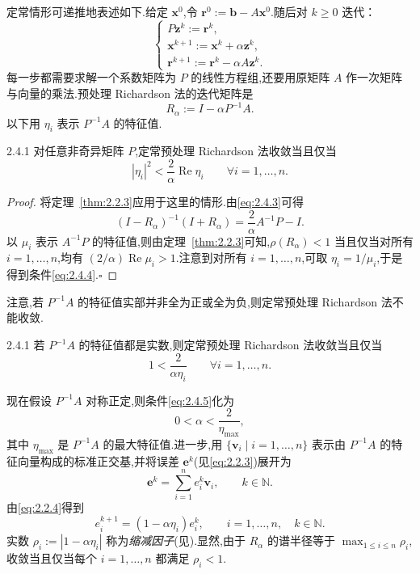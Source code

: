定常情形可递推地表述如下.给定 \(\boldsymbol{x}^0\),令 \(\boldsymbol{r}^0:=\boldsymbol{b}-A\boldsymbol{x}^0\).随后对 \(k\ge0\) 迭代：
\begin{equation}\label{eq:2.4.2}
  \begin{cases}
    P\boldsymbol{z}^k:=\boldsymbol{r}^k,\\
    \boldsymbol{x}^{k+1}:=\boldsymbol{x}^k+\alpha\boldsymbol{z}^k,\\
    \boldsymbol{r}^{k+1}:=\boldsymbol{r}^k-\alpha A\boldsymbol{z}^k.
  \end{cases}
\end{equation}
每一步都需要求解一个系数矩阵为 \(P\) 的线性方程组,还要用原矩阵 \(A\) 作一次矩阵与向量的乘法.预处理 Richardson 法的迭代矩阵是
\begin{equation}\label{eq:2.4.3}
  R_\alpha:=I-\alpha P^{-1}A.
\end{equation}
以下用 \(\eta_i\) 表示 \(P^{-1}A\) 的特征值.

\begin{theorem}[]{2.4.1}
对任意非奇异矩阵 \(P\),定常预处理 Richardson 法收敛当且仅当
\begin{equation}\label{eq:2.4.4}
  |\eta_i|^2<\frac2\alpha\operatorname{Re}\eta_i
  \qquad \forall i=1,\ldots,n.
\end{equation}
\end{theorem}

\begin{proof}
将定理~\ref{thm:2.2.3}应用于这里的情形.由\eqref{eq:2.4.3}可得
\[
  (I-R_\alpha)^{-1}(I+R_\alpha)=\frac2\alpha A^{-1}P-I.
\]
以 \(\mu_i\) 表示 \(A^{-1}P\) 的特征值,则由定理~\ref{thm:2.2.3}可知,\(\rho(R_\alpha)<1\) 当且仅当对所有 \(i=1,\ldots,n\),均有 \((2/\alpha)\operatorname{Re}\mu_i>1\).注意到对所有 \(i=1,\ldots,n\),可取 \(\eta_i=1/\mu_i\),于是得到条件\eqref{eq:2.4.4}.\hfill\(\square\)
\end{proof}

注意,若 \(P^{-1}A\) 的特征值实部并非全为正或全为负,则定常预处理 Richardson 法不能收敛.

\begin{corollary}[]{2.4.1}
若 \(P^{-1}A\) 的特征值都是实数,则定常预处理 Richardson 法收敛当且仅当
\begin{equation}\label{eq:2.4.5}
  1<\frac2{\alpha\eta_i}\qquad \forall i=1,\ldots,n.
\end{equation}
\end{corollary}

现在假设 \(P^{-1}A\) 对称正定,则条件\eqref{eq:2.4.5}化为
\[
  0<\alpha<\frac2{\eta_{\max}},
\]
其中 \(\eta_{\max}\) 是 \(P^{-1}A\) 的最大特征值.进一步,用 \(\{\boldsymbol{v}_i\mid i=1,\ldots,n\}\) 表示由 \(P^{-1}A\) 的特征向量构成的标准正交基,并将误差 \(\boldsymbol{e}^k\)(见\eqref{eq:2.2.3})展开为
\[
  \boldsymbol{e}^k=\sum_{i=1}^n e_i^k\boldsymbol{v}_i,\qquad k\in\mathbb N.
\]
由\eqref{eq:2.2.4}得到
\begin{equation}\label{eq:2.4.6}
  e_i^{k+1}=(1-\alpha\eta_i)e_i^k,\qquad i=1,\ldots,n,\quad k\in\mathbb N.
\end{equation}
实数 \(\rho_i:=|1-\alpha\eta_i|\) 称为\emph{缩减因子}(见).显然,由于 \(R_\alpha\) 的谱半径等于 \(\max_{1\le i\le n}\rho_i\),收敛当且仅当每个 \(i=1,\ldots,n\) 都满足 \(\rho_i<1\).

